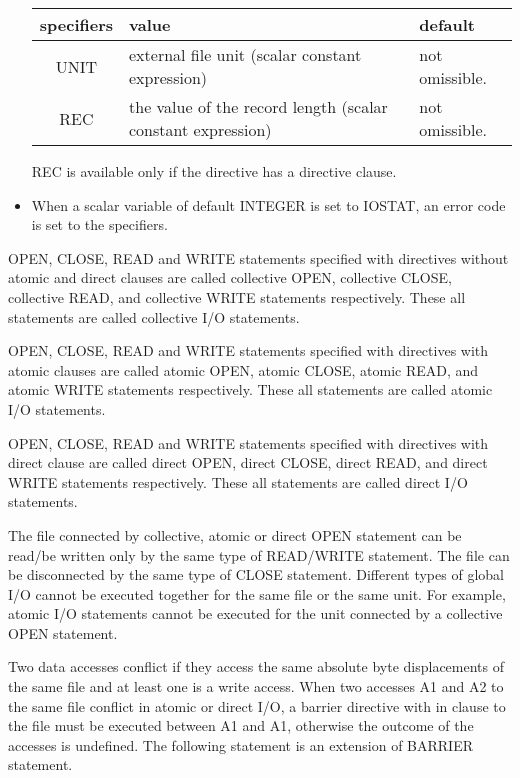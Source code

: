 \begin{itemize}
   \begin{table}[h]
    \begin{center}
     \label{tb:globalopen}
     \begin{tabular}{|c||p{90mm}|l|}
       \hline
      specifiers & value & default \\ \hline \hline
      UNIT & external file unit (scalar constant expression)
	  & not omissible. \\ \hline
      REC & the value of the record length (scalar constant expression)
	  & not omissible. \\ \hline
     \end{tabular}
    \end{center}
   \end{table}

   REC is available only if the directive has a directive clause.
   
   \item When a scalar variable of default INTEGER is set to IOSTAT, an
     error code is set to the specifiers.
	 
   \end{itemize}

   OPEN, CLOSE, READ and WRITE statements specified with \gio directives
   without atomic and direct clauses are called collective OPEN, collective
   CLOSE, collective READ, and collective WRITE statements respectively.
   These all statements are called collective I/O statements.

   OPEN, CLOSE, READ and WRITE statements specified with \gio directives
   with atomic clauses are called atomic OPEN, atomic CLOSE, atomic READ, and
   atomic WRITE statements respectively.
   These all statements are called atomic I/O statements.

   OPEN, CLOSE, READ and WRITE statements specified with \gio directives
   with direct clause are called direct OPEN, direct CLOSE, direct READ, and
   direct WRITE statements respectively.
   These all statements are called direct I/O statements.

   The file connected by collective, atomic or direct OPEN statement can
   be read/be written only by the same type of READ/WRITE statement.
   The file can be disconnected by the same type of CLOSE statement.
   Different types of global I/O cannot be executed together for the same file or the
   same unit.
   For example, atomic I/O statements cannot be executed for the unit
   connected by a collective OPEN statement.


   Two data accesses conflict if they access the same absolute byte displacements of the same file and at least one is a write access.
   When two accesses A1 and A2 to the same file conflict in atomic or direct I/O, a barrier directive with in clause to the file must be executed between A1 and A1, otherwise the outcome of the accesses is undefined.
   The following statement is an extension of BARRIER statement.
   
